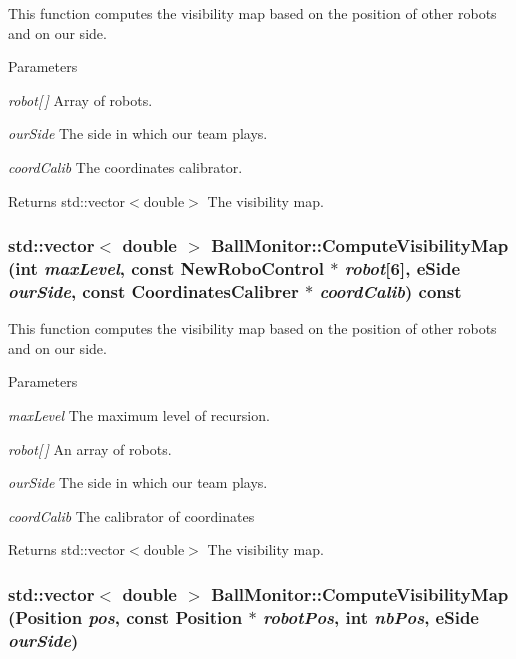 This function computes the visibility map based on the position of other robots and on our side. 


\begin{DoxyParams}{Parameters}
\item[{\em robot\mbox{[}$\,$\mbox{]}}]Array of robots. \item[{\em ourSide}]The side in which our team plays. \item[{\em coordCalib}]The coordinates calibrator. \end{DoxyParams}
\begin{DoxyReturn}{Returns}
std::vector$<$double$>$ The visibility map. 
\end{DoxyReturn}
\hypertarget{classBallMonitor_aad046acf9df6b0381ab3b1b8351e97c5}{
\subsubsection[{ComputeVisibilityMap}]{\setlength{\rightskip}{0pt plus 5cm}std::vector$<$ double $>$ BallMonitor::ComputeVisibilityMap (int {\em maxLevel}, \/  const {\bf NewRoboControl} $\ast$ {\em robot}\mbox{[}6\mbox{]}, \/  eSide {\em ourSide}, \/  const {\bf CoordinatesCalibrer} $\ast$ {\em coordCalib}) const}}
\label{classBallMonitor_aad046acf9df6b0381ab3b1b8351e97c5}


This function computes the visibility map based on the position of other robots and on our side. 


\begin{DoxyParams}{Parameters}
\item[{\em maxLevel}]The maximum level of recursion. \item[{\em robot\mbox{[}$\,$\mbox{]}}]An array of robots. \item[{\em ourSide}]The side in which our team plays. \item[{\em coordCalib}]The calibrator of coordinates \end{DoxyParams}
\begin{DoxyReturn}{Returns}
std::vector$<$double$>$ The visibility map. 
\end{DoxyReturn}
\hypertarget{classBallMonitor_a53e07299cf403dd036cab543d37fbf92}{
\subsubsection[{ComputeVisibilityMap}]{\setlength{\rightskip}{0pt plus 5cm}std::vector$<$ double $>$ BallMonitor::ComputeVisibilityMap (Position {\em pos}, \/  const Position $\ast$ {\em robotPos}, \/  int {\em nbPos}, \/  eSide {\em ourSide})}}
\label{classBallMonitor_a53e07299cf403dd036cab543d37fbf92}


